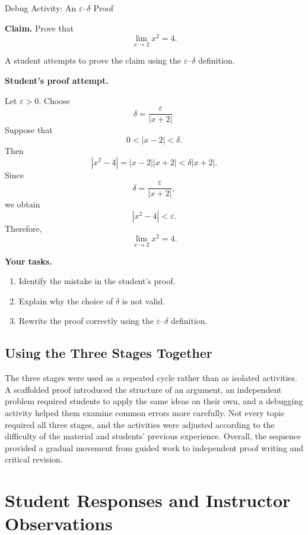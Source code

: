 \documentclass[12pt]{article}
\begin{document}
\begin{activitybox}{Debug Activity: An \(\varepsilon\)--\(\delta\) Proof}

\textbf{Claim.}
Prove that
\[
    \lim_{x\to 2}x^2=4.
\]

A student attempts to prove the claim using the \(\varepsilon\)--\(\delta\) definition.

\medskip

\textbf{Student's proof attempt.}

Let \(\varepsilon>0\). Choose
\[
    \delta=\frac{\varepsilon}{|x+2|}.
\]
Suppose that
\[
    0<|x-2|<\delta.
\]
Then
\[
    |x^2-4|
    =
    |x-2||x+2|
    <
    \delta|x+2|.
\]
Since
\[
    \delta=\frac{\varepsilon}{|x+2|},
\]
we obtain
\[
    |x^2-4|<\varepsilon.
\]
Therefore,
\[
    \lim_{x\to 2}x^2=4.
\]

\medskip

\textbf{Your tasks.}

\begin{enumerate}
    \item Identify the mistake in the student's proof.
    \item Explain why the choice of \(\delta\) is not valid.
    \item Rewrite the proof correctly using the
    \(\varepsilon\)--\(\delta\) definition.
\end{enumerate}

\end{activitybox}

\subsection{Using the Three Stages Together}

The three stages were used as a repeated cycle rather than as isolated activities. A scaffolded proof introduced the structure of an argument, an independent problem required students to apply the same ideas on their own, and a debugging activity helped them examine common errors more carefully. Not every topic required all three stages, and the activities were adjusted according to the difficulty of the material and students' previous experience. Overall, the sequence provided a gradual movement from guided work to independent proof writing and critical revision.

\section{Student Responses and Instructor Observations}
\label{sec:student_responses}
\end{document}
